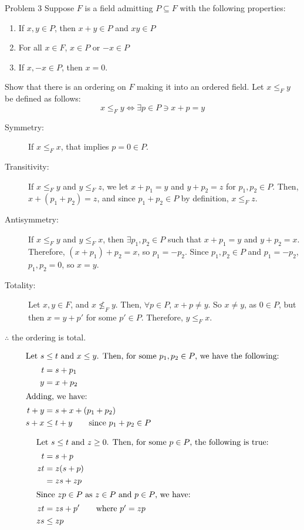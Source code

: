 \documentclass[10pt]{extarticle}
\begin{document}
  \begin{problem}{Problem 3}
    Suppose $F$ is a field admitting $P\subseteq F$ with the following properties:
    \begin{enumerate}[(C1)]
      \item If $x,y\in P$, then $x+y\in P$ and $xy\in P$
      \item For all $x\in F$, $x\in P$ or $-x\in P$
      \item If $x,-x\in P$, then $x = 0$.
    \end{enumerate}
    Show that there is an ordering on $F$ making it into an ordered field.
    \tcblower
    Let $x\leq_F y$ be defined as follows:
    \[
      x\leq_F y \Leftrightarrow \exists p\in P \ni x+p = y
    \] 
    \begin{description}
      \item[Symmetry:] If $x\leq_F x$, that implies $p = 0\in P$.
      \item[Transitivity:] If $x\leq_F y$ and $y\leq_F z$, we let $x+p_1 = y$ and $y+p_2 = z$ for $p_1,p_2\in P$. Then, $x + (p_1 + p_2) = z$, and since $p_1 + p_2\in P$ by definition, $x\leq_F z$.
      \item[Antisymmetry:] If $x \leq_F y$ and $y\leq_F x$, then $\exists p_1,p_2\in P$ such that $x+p_1 = y$ and $y + p_2 = x$. Therefore, $(x+p_1) + p_2 = x$, so $p_1 = -p_2$. Since $p_1,p_2\in P$ and $p_1 = -p_2$, $p_1,p_2 = 0$, so $x = y$.
      \item[Totality:] Let $x,y\in F$, and $x\not\leq_F y$. Then, $\forall p\in P$, $x + p \neq y$. So $x\neq y$, as $0\in P$, but then $x = y + p'$ for some $p'\in P$. Therefore, $y\leq_F x$.
    \end{description}
    $\therefore$ the ordering is total.
    \begin{description}[font=\normalfont]
      \item[Ordered Field Axiom (i)]\hfill
        \begin{align*}
          \shortintertext{Let $s\leq t$ and $x\leq y$. Then, for some $p_1,p_2\in P$, we have the following:}
          t &= s + p_1\\
          y &= x + p_2\\
          \shortintertext{Adding, we have:}
          t + y &= s + x + (p_1 + p_2)\\
          s+x &\leq t+y \tag*{since $p_1 + p_2\in P$}
        \end{align*}
      \item[Ordered Field Axiom (ii)]
        \begin{align*}
          \shortintertext{Let $s \leq t$ and $z\geq 0$. Then, for some $p\in P$, the following is true:}
          t &= s + p\\
          zt &= z(s+p)\\
             &= zs + zp\\
             \shortintertext{Since $zp \in P$ as $z\in P$ and $p\in P$, we have:}
          zt &= zs + p'\tag*{where $p' = zp$}\\
          zs &\leq zp
        \end{align*}
    \end{description}
  \end{problem}
\end{document}
